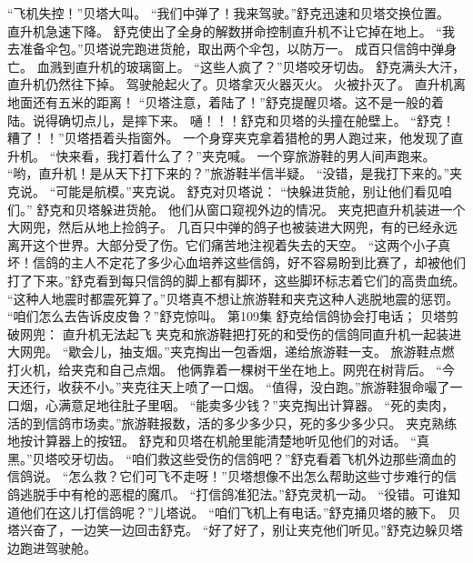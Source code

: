 \documentclass[a4paper,12pt,UTF8,twoside]{ctexbook}
\begin{document}
        “飞机失控！”贝塔大叫。 
        “我们中弹了！我来驾驶。”舒克迅速和贝塔交换位置。 
        直升机急速下降。 
        舒克使出了全身的解数拼命控制直升机不让它掉在地上。 
        “我去准备伞包。”贝塔说完跑进货舱，取出两个伞包，以防万一。 
        成百只信鸽中弹身亡。 
        血溅到直升机的玻璃窗上。 
        “这些人疯了？”贝塔咬牙切齿。 
        舒克满头大汗，直升机仍然往下掉。 
        驾驶舱起火了。贝塔拿灭火器灭火。 
        火被扑灭了。 
        直升机离地面还有五米的距离！ 
        “贝塔注意，着陆了！”舒克提醒贝塔。这不是一般的着陆。说得确切点儿，是摔下来。 
        嗵！！！舒克和贝塔的头撞在舱壁上。 
        “舒克！糟了！！”贝塔捂着头指窗外。 
        一个身穿夹克拿着猎枪的男人跑过来，他发现了直升机。 
        “快来看，我打着什么了？”夹克喊。 
        一个穿旅游鞋的男人间声跑来。 
        “哟，直升机！是从天下打下来的？”旅游鞋半信半疑。 
        “没错，是我打下来的。”夹克说。 
        “可能是航模。”夹克说。 
        舒克对贝塔说：  “快躲进货舱，别让他们看见咱们。” 
        舒克和贝塔躲进货舱。 
        他们从窗口窥视外边的情况。 
        夹克把直升机装进一个大网兜，然后从地上捡鸽子。 
        几百只中弹的鸽子也被装进大网兜，有的已经永远离开这个世界。大部分受了伤。它们痛苦地注视着失去的天空。 
        “这两个小子真坏！信鸽的主人不定花了多少心血培养这些信鸽，好不容易盼到比赛了，却被他们打了下来。”舒克看到每只信鸽的脚上都有脚环，这些脚环标志着它们的高贵血统。 
        “这种人地震时都震死算了。”贝塔真不想让旅游鞋和夹克这种人逃脱地震的惩罚。 
        “咱们怎么去告诉皮皮鲁？”舒克惊叫。   第109集 
        舒克给信鸽协会打电话； 
        贝塔剪破网兜： 
        直升机无法起飞   
        夹克和旅游鞋把打死的和受伤的信鸽同直升机一起装进大网兜。 
        “歇会儿，抽支烟。”夹克掏出一包香烟，递给旅游鞋一支。 
        旅游鞋点燃打火机，给夹克和自己点烟。 
        他俩靠着一棵树干坐在地上。网兜在树背后。 
        “今天还行，收获不小。”夹克往天上喷了一口烟。 
        “值得，没白跑。”旅游鞋狠命嘬了一口烟，心满意足地往肚子里咽。 
        “能卖多少钱？”夹克掏出计算器。 
        “死的卖肉，活的到信鸽市场卖。”旅游鞋报数，活的多少多少只，死的多少多少只。 
        夹克熟练地按计算器上的按钮。 
        舒克和贝塔在机舱里能清楚地听见他们的对话。 
        “真黑。”贝塔咬牙切齿。 
        “咱们救这些受伤的信鸽吧？”舒克看着飞机外边那些滴血的信鸽说。 
        “怎么救？它们可飞不走呀！”贝塔想像不出怎么帮助这些寸步难行的信鸽逃脱手中有枪的恶棍的魔爪。 
        “打信鸽准犯法。”舒克灵机一动。 
        “役错。可谁知道他们在这儿打信鸽呢？”儿塔说。 
        “咱们飞机上有电话。”舒克捅贝塔的腋下。 
        贝塔兴奋了，一边笑一边回击舒克。 
        “好了好了，别让夹克他们听见。”舒克边躲贝塔边跑进驾驶舱。 
\end{document}
